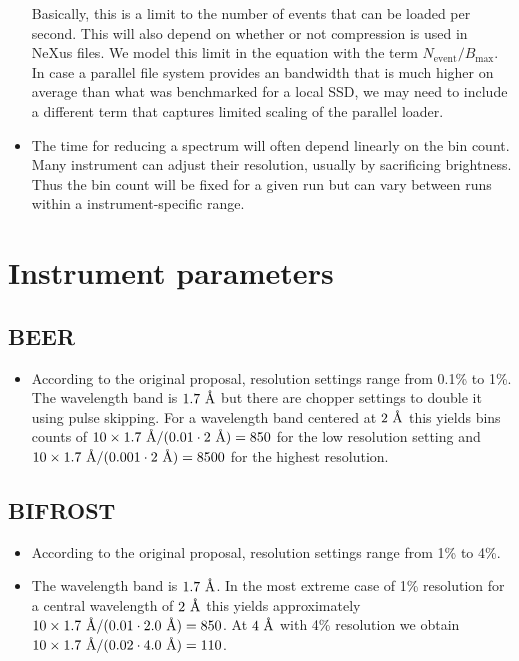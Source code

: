 \documentclass[a4paper,english,numbers=noenddot,bibliography=totoc,chapterprefix=on,DIV=12]{scrartcl}
\newcommand{\angstrom}{\textup{\AA}}
\newcommand{\Nevent}{N_{\text{event}}}
\newcommand{\Bmax}{B_{\text{max}}}
\newcommand{\beer}{BEER\xspace}
\newcommand{\bifrost}{BIFROST\xspace}
\begin{document}
\begin{itemize}
  Basically, this is a limit to the number of events that can be loaded per second.
  This will also depend on whether or not compression is used in NeXus files.
  We model this limit in the equation with the term $\Nevent/\Bmax$.
  In case a parallel file system provides an bandwidth that is much higher on average than what was benchmarked for a local SSD, we may need to include a different term that captures limited scaling of the parallel loader.
\item The time for reducing a spectrum will often depend linearly on the bin count.
  Many instrument can adjust their resolution, usually by sacrificing brightness.
  Thus the bin count will be fixed for a given run but can vary between runs within a instrument-specific range.
\end{itemize}

\section{Instrument parameters}
\label{app:instrument-parameters}

\subsection{\beer}

\begin{itemize}
  \item According to the original proposal, resolution settings range from 0.1\% to 1\%.
    The wavelength band is $1.7~\angstrom$ but there are chopper settings to double it using pulse skipping.
    For a wavelength band centered at $2~\angstrom$ this yields bins counts of $10\times1.7~\angstrom/(0.01\cdot2~\angstrom) = 850$ for the low resolution setting and $10\times1.7~\angstrom/(0.001\cdot2~\angstrom) = 8500$ for the highest resolution.
\end{itemize}

\subsection{\bifrost}

\begin{itemize}
  \item According to the original proposal, resolution settings range from 1\% to 4\%.
  \item The wavelength band is $1.7~\angstrom$.
    In the most extreme case of 1\% resolution for a central wavelength of $2~\angstrom$ this yields approximately $10\times1.7~\angstrom/(0.01\cdot2.0~\angstrom) = 850$.
    At $4~\angstrom$ with 4\% resolution we obtain $10\times1.7~\angstrom/(0.02\cdot4.0~\angstrom) = 110$.
\end{itemize}
\end{document}
